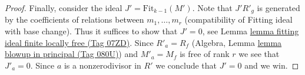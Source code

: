 \documentclass{amsart}
\theoremstyle{plain}
\theoremstyle{definition}
\theoremstyle{remark}
\numberwithin{equation}{subsection}
\begin{document}
\begin{proof}
\medskip\noindent
Finally, consider the ideal $J' = \text{Fit}_{k - 1}(M')$.
Note that $J' R'_g$ is generated by the coefficients of relations between
$m_1, \ldots, m_r$ (compatibility of Fitting ideal with base change).
Thus it suffices to show that $J' = 0$, see
Lemma \href{https://stacks.math.columbia.edu/tag/07ZD}{lemma fitting ideal finite locally free (Tag 07ZD)}.
Since $R'_a = R_f$ (Algebra, Lemma \href{https://stacks.math.columbia.edu/tag/080U}{lemma blowup in principal (Tag 080U)})
and $M'_a = M_f$ is free of rank $r$ we see that $J'_a = 0$.
Since $a$ is a nonzerodivisor in $R'$ we
conclude that $J' = 0$ and we win.
\end{proof}
\end{document}
